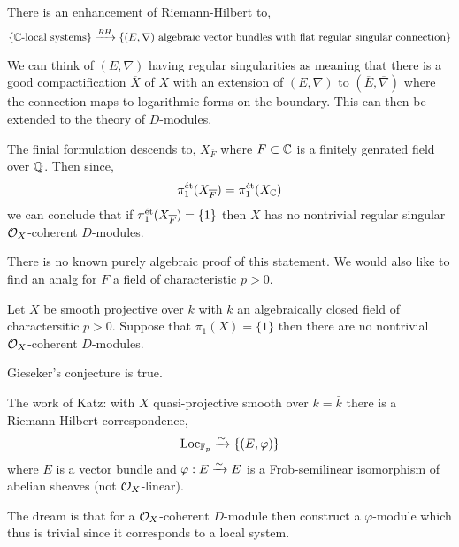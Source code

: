 \documentclass[12pt]{article}
\begin{document}
\begin{theorem}[Deligne]
There is an enhancement of Riemann-Hilbert to,
\[ \{ \mathbb{C}\text{-local systems} \} \xrightarrow{RH} \{ (E, \nabla) \text{ algebraic vector bundles with flat regular singular connection} \} \]
\end{theorem}

\begin{rmk}
We can think of $(E, \nabla)$ having regular singularities as meaning that there is a good compactification $\overline{X}$ of $X$ with an extension of $(E, \nabla)$ to $(\overline{E}, \overline{\nabla})$ where the connection maps to logarithmic forms on the boundary. This can then be extended to the theory of $D$-modules. 
\end{rmk}

The finial formulation descends to,
$X_{\overline{F}}$ where $F \subset \mathbb{C}$ is a finitely genrated field over $\mathbb{Q}$. Then since,
\[ \pi_1^{\text{\'{e}t}}(X_{\overline{F}}) = \pi_1^{\text{\'{e}t}}(X_{\mathbb{C}}) \]
we can conclude that if $\pi_1^{\text{\'{e}t}}(X_{\overline{F}}) = \{ 1 \}$ then $X$ has no nontrivial regular singular $\mathcal{O}_{X}$-coherent $D$-modules.

\begin{rmk}
There is no known purely algebraic proof of this statement. We would also like to find an analg for $F$ a field of characteristic $p > 0$. 
\end{rmk}

\begin{conj}[Gieseker, 1975]
Let $X$ be smooth projective over $k$ with $k$ an algebraically closed field of charactersitic $p > 0$. Suppose that $\pi_1(X) = \{ 1 \}$ then there are no nontrivial $\mathcal{O}_{X}$-coherent $D$-modules. 
\end{conj}

\begin{theorem}[E-Mehta, 2010]
Gieseker's conjecture is true. 
\end{theorem}

\begin{rmk}
The work of Katz: with $X$ quasi-projective smooth over $k = \bar{k}$ there is a Riemann-Hilbert correspondence,
\[ \mathrm{Loc}_{\mathbb{F}_p} \xrightarrow{\sim} \{ (E, \varphi) \} \]
where $E$ is a vector bundle and $\varphi : E \xrightarrow{\sim} E$ is a Frob-semilinear isomorphism of abelian sheaves (not $\mathcal{O}_{X}$-linear). 
\end{rmk}

\begin{rmk}
The dream is that for a $\mathcal{O}_{X}$-coherent $D$-module then construct a $\varphi$-module which thus is trivial since it corresponds to a local system. 
\end{rmk}
\end{document}
